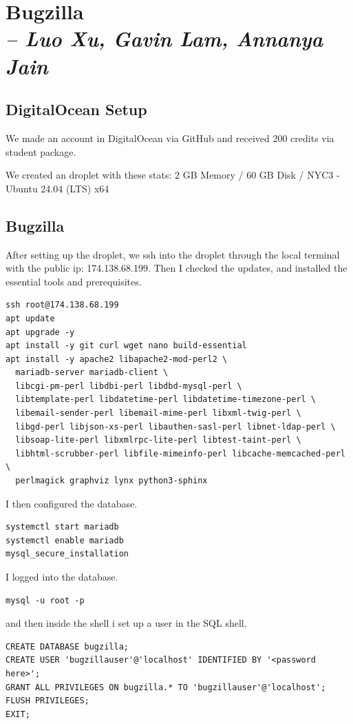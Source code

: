 \chapter{Bugzilla \\
\small{\textit{-- Luo Xu, Gavin Lam, Annanya Jain}
\label{Chapter::Bugzilla}}}

\section{DigitalOcean Setup}
We made an account in DigitalOcean via GitHub and received 200 credits via student package.

\noindent We created an droplet with these stats: 2 GB Memory / 60 GB Disk / NYC3 - Ubuntu 24.04 (LTS) x64

\section{Bugzilla}
After setting up the droplet, we ssh into the droplet through the local terminal with the public ip: 174.138.68.199. Then I checked the updates, and installed the essential tools and prerequisites.
\begin{verbatim}
ssh root@174.138.68.199
apt update
apt upgrade -y
apt install -y git curl wget nano build-essential
apt install -y apache2 libapache2-mod-perl2 \
  mariadb-server mariadb-client \
  libcgi-pm-perl libdbi-perl libdbd-mysql-perl \
  libtemplate-perl libdatetime-perl libdatetime-timezone-perl \
  libemail-sender-perl libemail-mime-perl libxml-twig-perl \
  libgd-perl libjson-xs-perl libauthen-sasl-perl libnet-ldap-perl \
  libsoap-lite-perl libxmlrpc-lite-perl libtest-taint-perl \
  libhtml-scrubber-perl libfile-mimeinfo-perl libcache-memcached-perl \
  perlmagick graphviz lynx python3-sphinx
\end{verbatim}
I then configured the database.
\begin{verbatim}
systemctl start mariadb
systemctl enable mariadb
mysql_secure_installation
\end{verbatim}
I logged into the database.
\begin{verbatim}
mysql -u root -p
\end{verbatim}
and then inside the shell i set up a user in the SQL shell.
\begin{verbatim}
CREATE DATABASE bugzilla;
CREATE USER 'bugzillauser'@'localhost' IDENTIFIED BY '<password here>';
GRANT ALL PRIVILEGES ON bugzilla.* TO 'bugzillauser'@'localhost';
FLUSH PRIVILEGES;
EXIT;
\end{verbatim}
